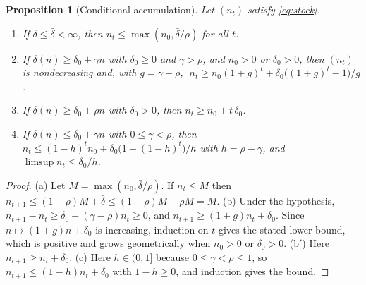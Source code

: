 \documentclass[11pt]{article}
\newtheorem{proposition}{Proposition}[section]
\theoremstyle{definition}
\theoremstyle{remark}
\begin{document}
\begin{proposition}[Conditional accumulation]\label{prop:accum}
Let $(n_t)$ satisfy \eqref{eq:stock}.
\begin{enumerate}
\item[(a)] If $\delta\le\bar\delta<\infty$, then $n_t\le\max(n_0,\bar\delta/\rho)$ for all $t$.
\item[(b)] If $\delta(n)\ge\delta_0+\gamma n$ with $\delta_0\ge0$ and $\gamma>\rho$, and $n_0>0$ or $\delta_0>0$, then $(n_t)$ is nondecreasing and, with $g=\gamma-\rho$, $\;n_t\ge n_0(1+g)^t+\delta_0\bigl((1+g)^t-1\bigr)/g$.
\item[(b$'$)] If $\delta(n)\ge\delta_0+\rho n$ with $\delta_0>0$, then $n_t\ge n_0+t\,\delta_0$.
\item[(c)] If $\delta(n)\le\delta_0+\gamma n$ with $0\le\gamma<\rho$, then $n_t\le(1-h)^t n_0+\delta_0\bigl(1-(1-h)^t\bigr)/h$ with $h=\rho-\gamma$, and $\limsup n_t\le\delta_0/h$.
\end{enumerate}
\end{proposition}
\begin{proof}
(a) Let $M=\max(n_0,\bar\delta/\rho)$. If $n_t\le M$ then $n_{t+1}\le(1-\rho)M+\bar\delta\le(1-\rho)M+\rho M=M$. (b) Under the hypothesis, $n_{t+1}-n_t\ge\delta_0+(\gamma-\rho)n_t\ge0$, and $n_{t+1}\ge(1+g)n_t+\delta_0$. Since $n\mapsto(1+g)n+\delta_0$ is increasing, induction on $t$ gives the stated lower bound, which is positive and grows geometrically when $n_0>0$ or $\delta_0>0$. (b$'$) Here $n_{t+1}\ge n_t+\delta_0$. (c) Here $h\in(0,1]$ because $0\le\gamma<\rho\le1$, so $n_{t+1}\le(1-h)n_t+\delta_0$ with $1-h\ge0$, and induction gives the bound.
\end{proof}
\end{document}
